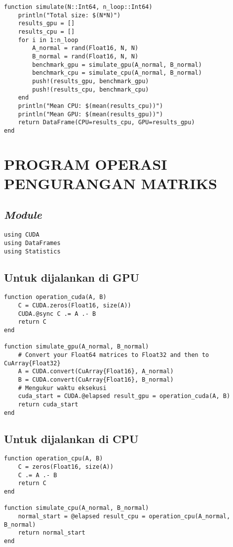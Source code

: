 \begin{lstlisting}
function simulate(N::Int64, n_loop::Int64)
    println("Total size: $(N*N)")
    results_gpu = []
    results_cpu = []
    for i in 1:n_loop
        A_normal = rand(Float16, N, N)
        B_normal = rand(Float16, N, N)
        benchmark_gpu = simulate_gpu(A_normal, B_normal)
        benchmark_cpu = simulate_cpu(A_normal, B_normal)
        push!(results_gpu, benchmark_gpu)
        push!(results_cpu, benchmark_cpu)
    end
    println("Mean CPU: $(mean(results_cpu))")
    println("Mean GPU: $(mean(results_gpu))")
    return DataFrame(CPU=results_cpu, GPU=results_gpu)
end
\end{lstlisting}

\chapter{PROGRAM OPERASI PENGURANGAN MATRIKS}
\label{appx:substraction}

\section{\emph{Module}}

\begin{lstlisting}
using CUDA
using DataFrames
using Statistics
\end{lstlisting}

\section{Untuk dijalankan di GPU}

\begin{lstlisting}
function operation_cuda(A, B)
    C = CUDA.zeros(Float16, size(A))
    CUDA.@sync C .= A .- B
    return C
end

function simulate_gpu(A_normal, B_normal)
    # Convert your Float64 matrices to Float32 and then to CuArray{Float32}
    A = CUDA.convert(CuArray{Float16}, A_normal)
    B = CUDA.convert(CuArray{Float16}, B_normal)
    # Mengukur waktu eksekusi
    cuda_start = CUDA.@elapsed result_gpu = operation_cuda(A, B)
    return cuda_start
end
\end{lstlisting}

\section{Untuk dijalankan di CPU}

\begin{lstlisting}
function operation_cpu(A, B)
    C = zeros(Float16, size(A))
    C .= A .- B
    return C
end

function simulate_cpu(A_normal, B_normal)
    normal_start = @elapsed result_cpu = operation_cpu(A_normal, B_normal)
    return normal_start
end
\end{lstlisting}

